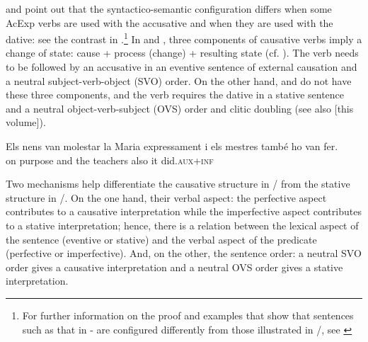 \documentclass[output=paper,colorlinks,citecolor=brown,nonflat]{./langscibook}
\begin{document}
\citet{Ynglès1991} and \citet{CabréMateu1998} point out that the syntactico-semantic configuration differs when some AcExp verbs are used with the accusative and when they are used with the dative: see the contrast in .\footnote{For further information on the proof and examples that show that sentences such as that in  - are configured differently from those illustrated in /, see \citet[Section 4.1]{Royo2017}} In  and , three components of causative verbs imply a change of state: cause + process (change) + resulting state (cf. \citealt{LevinRappaportHovav1995, CabréMateu1998, Rossello2008}). The verb needs to be followed by an accusative in an eventive sentence of external causation and a neutral subject-verb-object (SVO) order. On the other hand,  and  do not have these three components, and the verb requires the dative in a stative sentence and a neutral object-verb-subject (OVS) order and clitic doubling (see also \citealt{chapters/fabregas} [this volume]).

\ea%
 \label{ex:royo:3}
 \ea \label{ex:royo:3a}
 \gll Els nens van molestar la Maria {expressament} i els mestres també {ho} {van} {fer}.
 \\
 on purpose and the teachers also it did.\textsc{aux+inf}\\
 \glt
 
 
 \z
 \z

Two mechanisms help differentiate the causative structure in / from the stative structure in /. On the one hand, their verbal aspect: the perfective aspect contributes to a causative interpretation while the imperfective aspect contributes to a stative interpretation; hence, there is a relation between the lexical aspect of the sentence (eventive or stative) and the verbal aspect of the predicate (perfective or imperfective). And, on the other, the sentence order: a neutral SVO order gives a causative interpretation and a neutral OVS order gives a stative interpretation.
\end{document}
